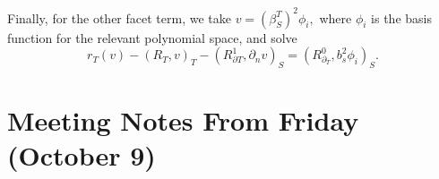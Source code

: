 \documentclass[12pt,a4paper]{article}
\begin{document}
Finally, for the other facet term, we take $v = (\beta_S^T)^2\phi_i,$ where $\phi_i$ is the basis function for the relevant polynomial space, and solve
\begin{equation}
    r_T(v) - (R_T, v)_T - (R_{\partial T}^1, \partial_n v)_S = (R_{\partial_T}^0, b_s^2 \phi_i)_S.
\end{equation}








\newpage

\section{Meeting Notes From Friday (October 9)}
\end{document}
